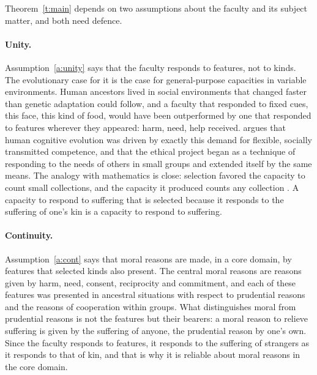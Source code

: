 \documentclass{situationist-preprint}
\begin{document}
Theorem~\ref{t:main} depends on two assumptions about the faculty and its subject matter, and both need defence.

\paragraph{Unity.} Assumption~\ref{a:unity} says that the faculty responds to features, not to kinds. The evolutionary case for it is the case for general-purpose capacities in variable environments. Human ancestors lived in social environments that changed faster than genetic adaptation could follow, and a faculty that responded to fixed cues, this face, this kind of food, would have been outperformed by one that responded to features wherever they appeared: harm, need, help received. \citet{Sterelny2012} argues that human cognitive evolution was driven by exactly this demand for flexible, socially transmitted competence, and \citet{Kitcher2011} that the ethical project began as a technique of responding to the needs of others in small groups and extended itself by the same means. The analogy with mathematics is close: selection favored the capacity to count small collections, and the capacity it produced counts any collection \citep{ClarkeDoane2012}. A capacity to respond to suffering that is selected because it responds to the suffering of one's kin is a capacity to respond to suffering.

\paragraph{Continuity.} Assumption~\ref{a:cont} says that moral reasons are made, in a core domain, by features that selected kinds also present. The central moral reasons are reasons given by harm, need, consent, reciprocity and commitment, and each of these features was presented in ancestral situations with respect to prudential reasons and the reasons of cooperation within groups. What distinguishes moral from prudential reasons is not the features but their bearers: a moral reason to relieve suffering is given by the suffering of anyone, the prudential reason by one's own. Since the faculty responds to features, it responds to the suffering of strangers as it responds to that of kin, and that is why it is reliable about moral reasons in the core domain.
\end{document}
